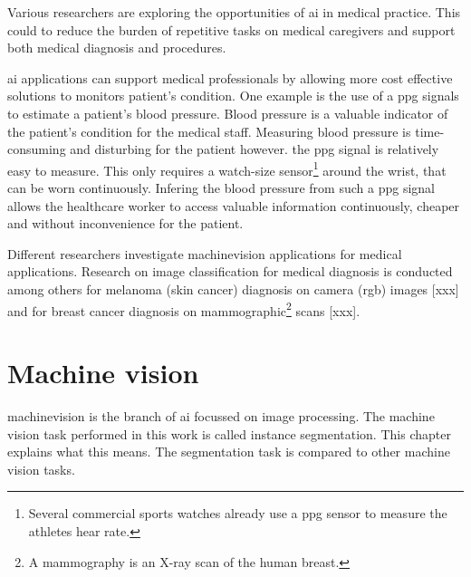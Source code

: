 \par{
    Various researchers are exploring the opportunities of \Gls{ai} in medical practice.
    This could to reduce the burden of repetitive tasks on medical caregivers and support both medical diagnosis and procedures.
}
\par{
    \Gls{ai} applications can support medical professionals by allowing more cost effective solutions to monitors patient's condition.
    One example is the use of a \acrfull{ppg} signals to estimate a patient's blood pressure.
    Blood pressure is a valuable indicator of the patient's condition for the medical staff.
    Measuring blood pressure is time-consuming and disturbing for the patient however. 
    the \acrshort{ppg} signal is relatively easy to measure. This only requires a watch-size sensor\footnote{Several commercial sports watches already use a \acrshort{ppg} sensor to measure the athletes hear rate.} 
    around the wrist, that can be worn continuously.
    Infering the blood pressure from such a \acrshort{ppg} signal allows the healthcare worker to access valuable information continuously, cheaper and without inconvenience for the patient.
}
\par{
    Different researchers investigate \Gls{machinevision} applications for medical applications. 
    Research on image classification for medical diagnosis is conducted among others for melanoma (skin cancer) diagnosis on camera (\acrshort{rgb}) images [xxx] 
    and for breast cancer diagnosis on mammographic\footnote{A mammography is an X-ray scan of the human breast.} scans [xxx].
}
\section{Machine vision}
\par{
    \Gls{machinevision} is the branch of \Gls{ai} focussed on image processing.
    The machine vision task performed in this work is called instance \Gls{segmentation}.
    This chapter explains what this means. 
    The segmentation task is compared to other machine vision tasks.
}

